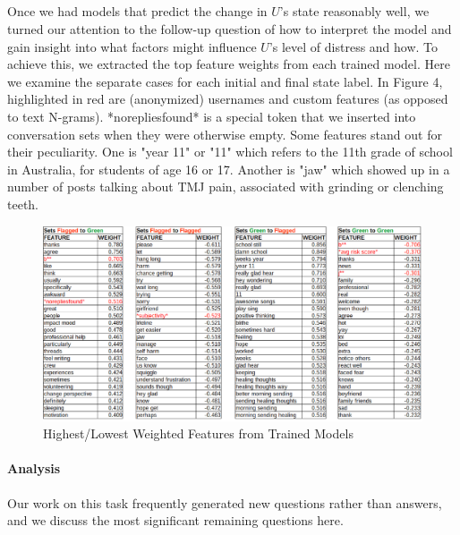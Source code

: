 \documentclass{article}
\begin{document}
\subparagraph{}Once we had models that predict the change in $U$'s state reasonably well, we turned our attention to the follow-up question of how to interpret the model and gain insight into what factors might influence $U$'s level of distress and how. To achieve this, we extracted the top feature weights from each trained model. Here we examine the separate cases for each initial and final state label. In Figure 4, highlighted in red are (anonymized) usernames and custom features (as opposed to text N-grams). *norepliesfound* is a special token that we inserted into conversation sets when they were otherwise empty. Some features stand out for their peculiarity. One is "year 11" or "11" which refers to the 11th grade of school in Australia, for students of age 16 or 17. Another is "jaw" which showed up in a number of posts talking about TMJ pain, associated with grinding or clenching teeth.

\begin{figure}[h!]
    \includegraphics[width=16cm]{topfeatures}
    \caption{Highest/Lowest Weighted Features from Trained Models}
\end{figure}

\paragraph{Analysis}Our work on this task frequently generated new questions rather than answers, and we discuss the most significant remaining questions here.
\end{document}
